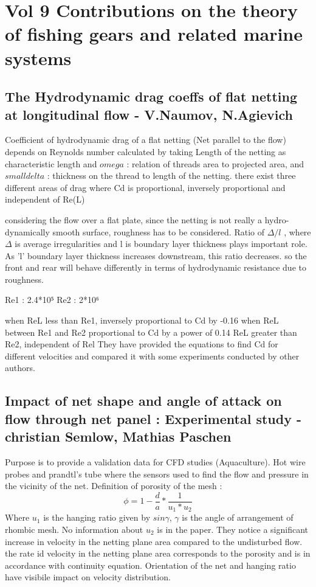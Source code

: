 \documentclass[letterpaper,12pt]{article}
\begin{document}

\section{Vol 9 Contributions on the theory of fishing gears and related marine systems}

\subsection{The Hydrodynamic drag coeffs of flat netting at longitudinal flow - V.Naumov, N.Agievich}
Coefficient of hydrodynamic drag of a flat netting (Net parallel to the flow) depends on Reynolds number calculated by taking Length of the netting as characteristic length and \(omega\) : relation of threads area to projected area, and \(small delta\) : thickness on the thread to length of the netting. there exist three different areas of drag where Cd is proportional, inversely proportional and independent of Re(L)

considering the flow over a flat plate, since the netting is not really a hydro-dynamically smooth surface, roughness has to be considered. Ratio of $\Delta/l$ , where $\Delta$ is average irregularities and l is boundary layer thickness plays important role. As 'l' boundary layer thickness increases downstream, this ratio decreases.  so the front and rear will behave differently in terms of hydrodynamic resistance due to roughness.

Re1 : 2.4*10⁵ 
Re2 : 2*10⁶

when ReL less than Re1, inversely proportional to Cd by -0.16
when ReL between Re1 and Re2 proportional to Cd by a power of 0.14
ReL greater than Re2, independent of Rel 
They have provided the equations to find Cd for different velocities and compared it with some experiments conducted by other authors.
\subsection{Impact of net shape and angle of attack on flow through net panel : Experimental study - christian Semlow, Mathias Paschen}
Purpose is to provide a validation data for CFD studies (Aquaculture). Hot wire probes and prandtl's tube where the sensors used to find the flow and pressure in the vicinity of the net.
Definition of porosity of the mesh : 
\begin{equation}
    \phi= 1 - \frac{d}{a}*\frac{1}{u_1*u_2}
\end{equation}
Where $u_1$ is the hanging ratio given by $sin\gamma$, $\gamma$ is the angle of arrangement of rhombic mesh. No information about $u_2$ is in the paper. 
They notice a significant increase in velocity in the netting plane area compared to the undisturbed flow. the rate id velocity in the netting plane area corresponds to the porosity and is in accordance with continuity equation. Orientation of the net and hanging ratio have visibile impact on velocity distribution.
\end{document}
